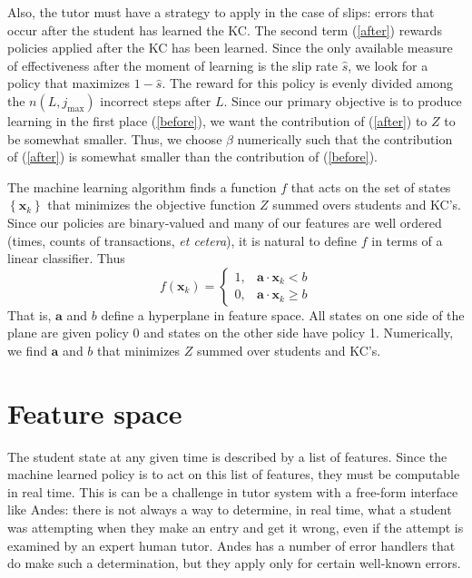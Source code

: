 \documentclass{edm_template}
\begin{document}
Also, the tutor must have a strategy to apply in the case of slips: 
errors that occur after the student has learned the KC.
The second term (\ref{after}) rewards policies applied after
the KC has been learned.  Since the only available measure of 
effectiveness after the moment of learning is the slip rate $\hat{s}$, 
we look for a policy that maximizes $1-\hat{s}$.  The reward for 
this policy is evenly divided among the $n(L,j_\mathrm{max})$ 
incorrect steps after $L$.
Since our primary objective is to produce learning in the first
place (\ref{before}), we want the contribution of (\ref{after})
to $Z$ to be somewhat smaller.  Thus, we choose $\beta$ numerically 
such that the contribution of (\ref{after}) is somewhat smaller than 
the contribution of (\ref{before}).

The machine learning algorithm finds a function $f$ that acts on
the set of states $\left\{\mathbf{x}_k\right\}$ that minimizes
the objective function $Z$ summed overs students and KC's.  
Since our policies are binary-valued
and many of our features are well ordered (times, counts of transactions,
{\em et cetera}), it is natural to define $f$ in terms of a 
linear classifier.  Thus
%
\begin{equation}
              f(\mathbf{x}_k) = \left\{\begin{array}{cc}
		1,& \mathbf{a}\cdot \mathbf{x}_k <b \\
                0, & \mathbf{a}\cdot \mathbf{x}_k \ge b
		\end{array} \right.
\end{equation}
%
That is, $\mathbf{a}$ and $b$ define a hyperplane in feature
space.  All states on one side of the plane are given policy 0
and states on the other side have policy 1.
Numerically, we find $\mathbf{a}$ and $b$ that minimizes $Z$
summed over students and KC's.

\section{Feature space}

The student state at any given time is described by a list of
features.   Since the machine learned policy is to act on this list of
features, they must be computable in real time.  This is can be a
challenge in tutor system with a free-form interface like  Andes:
there is not always a way to determine, in real time, what a student was
attempting when they make an entry and get it wrong, even if the attempt
is examined by an expert human tutor.  Andes has a
number of error handlers that do make such a determination, but they 
apply only for certain well-known errors.
\end{document}
